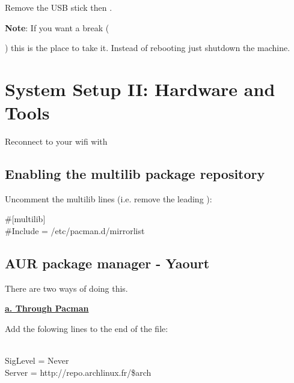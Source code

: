 
Remove the USB stick then .

\textbf{Note}: If you want a break (\begin{Large}\end{Large}) this is the place to take it. Instead of rebooting just shutdown the machine.

\section{System Setup II: Hardware and Tools}

Reconnect to your wifi with 

\subsection{Enabling the multilib package repository}

\begin{blocksection}
	Uncomment the multilib lines (i.e. remove the leading \code{\#}):
	\vspace*{1em}
	\begin{codeblock}
		\#[multilib]\\
		\#Include = /etc/pacman.d/mirrorlist
	\end{codeblock}
\end{blocksection}

\subsection{AUR package manager - Yaourt}

There are two ways of doing this.

\vspace*{1em}
\textbf{\textcolor{textgrey}{\uline{a. Through Pacman}}}

\begin{blocksection}
	Add the folowing lines to the end of the file:
	\vspace*{1em}
	\begin{codeblock}
		[archlinuxfr]\\
		SigLevel = Never\\
		Server = http://repo.archlinux.fr/\$arch
	\end{codeblock}
\end{blocksection}

